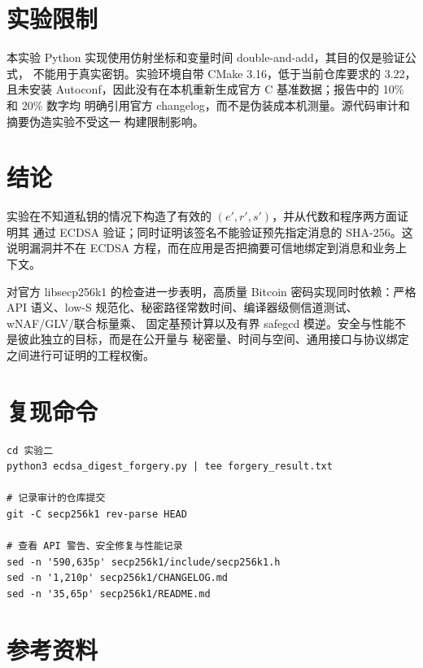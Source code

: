 \documentclass[UTF8,a4paper,12pt]{ctexart}
\begin{document}
\section{实验限制}

本实验 Python 实现使用仿射坐标和变量时间 double-and-add，其目的仅是验证公式，
不能用于真实密钥。实验环境自带 CMake 3.16，低于当前仓库要求的 3.22，且未安装
Autoconf，因此没有在本机重新生成官方 C 基准数据；报告中的 10\% 和 20\% 数字均
明确引用官方 changelog，而不是伪装成本机测量。源代码审计和摘要伪造实验不受这一
构建限制影响。

\section{结论}

实验在不知道私钥的情况下构造了有效的 $(e',r',s')$，并从代数和程序两方面证明其
通过 ECDSA 验证；同时证明该签名不能验证预先指定消息的 SHA-256。这说明漏洞并不在
ECDSA 方程，而在应用是否把摘要可信地绑定到消息和业务上下文。

对官方 libsecp256k1 的检查进一步表明，高质量 Bitcoin 密码实现同时依赖：严格 API
语义、low-S 规范化、秘密路径常数时间、编译器级侧信道测试、wNAF/GLV/联合标量乘、
固定基预计算以及有界 safegcd 模逆。安全与性能不是彼此独立的目标，而是在公开量与
秘密量、时间与空间、通用接口与协议绑定之间进行可证明的工程权衡。

\appendix
\section{复现命令}

\begin{lstlisting}[style=cmd]
cd 实验二
python3 ecdsa_digest_forgery.py | tee forgery_result.txt

# 记录审计的仓库提交
git -C secp256k1 rev-parse HEAD

# 查看 API 警告、安全修复与性能记录
sed -n '590,635p' secp256k1/include/secp256k1.h
sed -n '1,210p' secp256k1/CHANGELOG.md
sed -n '35,65p' secp256k1/README.md
\end{lstlisting}

\section{参考资料}
\end{document}
